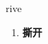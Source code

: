 
\begin{frame}
{\huge rive}
\begin{center}
\begin{enumerate}\Large
  \item \textbf{撕开}
\end{enumerate}
\end{center}
\end{frame}
